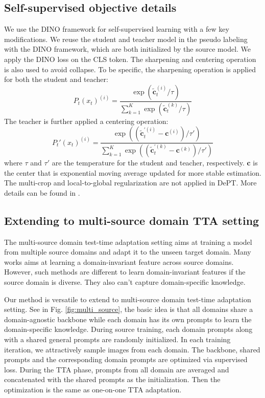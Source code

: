 \documentclass{article} \usepackage{iclr2023_conference,times}
\def\vc{{\bm{c}}}
\begin{document}
\subsection{Self-supervised objective details}\label{appendix:ss}

We use the DINO \citep{caron2021emerging} framework for self-supervised learning with a few key modifications. We reuse the student and teacher model in the pseudo labeling with the DINO framework, which are both initialized by the source model. We apply the DINO loss on the CLS token. The sharpening and centering operation is also used to avoid collapse. To be specific, the sharpening operation is applied for both the student and teacher:
\begin{equation}
    P_t(x_t)^{(i)}=\frac{\exp (\tilde{\displaystyle \vc}_t^{(i)} / \tau)}{\sum_{k=1}^K \exp (\tilde{\displaystyle \vc}_t^{(k)} / \tau)}
\end{equation}
The teacher is further applied a centering operation:
\begin{equation}
    P_t'(x_t)^{(i)}= \frac{\exp ((\tilde{\displaystyle \vc}_t^{\prime(i)} - \displaystyle \vc^{(i)})/ \tau')}{\sum_{k=1}^K \exp ((\tilde{\displaystyle \vc}_t^{\prime(k)} - \displaystyle \vc^{(k)})/ \tau')}  
\end{equation}
where $\tau$ and $\tau'$ are the temperature for the student and teacher, respectively. $\displaystyle \vc$ is the center that is exponential moving average updated for more stable estimation. The multi-crop and local-to-global regularization are not applied in DePT. More details can be found in \citep{caron2021emerging}.



\subsection{Extending to multi-source domain TTA setting}\label{appendix:multi-source}
The multi-source domain test-time adaptation setting aims at training a model from multiple source domains and adapt it to the unseen target domain. Many works aims at learning a domain-invariant feature across source domains. However, such methods are different to learn domain-invariant features if the source domain is diverse. They also can't capture domain-specific knowledge.

Our method is versatile to extend to multi-source domain test-time adaptation setting. See in Fig. \ref{fig:multi_source}, the basic idea is that all domains share a domain-agnostic backbone while each domain has its own prompts to learn the domain-specific knowledge. During source training, each domain prompts along with a shared general prompts are randomly initialized. In each training iteration, we attractively sample images from each domain. The backbone, shared prompts and the corresponding domain prompts are optimized via supervised loss. During the TTA phase, prompts from all domain are averaged and concatenated with the shared prompts as the initialization. Then the optimization is the same as one-on-one TTA adaptation. 
\end{document}
